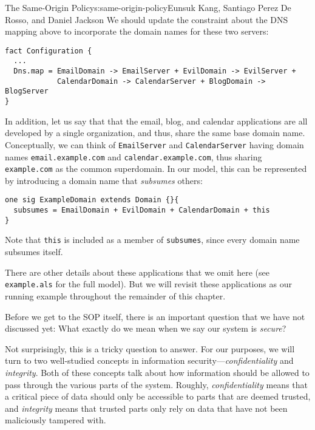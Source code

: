 \begin{aosachapter}{The Same-Origin Policy}{s:same-origin-policy}{Eunsuk Kang, Santiago Perez De Rosso, and Daniel Jackson}
We should update the constraint about the DNS mapping above to
incorporate the domain names for these two servers:

\begin{verbatim}
fact Configuration {
  ...
  Dns.map = EmailDomain -> EmailServer + EvilDomain -> EvilServer + 
            CalendarDomain -> CalendarServer + BlogDomain -> BlogServer  
}
\end{verbatim}

In addition, let us say that that the email, blog, and calendar
applications are all developed by a single organization, and thus, share
the same base domain name. Conceptually, we can think of
\texttt{EmailServer} and \texttt{CalendarServer} having domain names
\texttt{email.example.com} and \texttt{calendar.example.com}, thus
sharing \texttt{example.com} as the common superdomain. In our model,
this can be represented by introducing a domain name that
\emph{subsumes} others:

\begin{verbatim}
one sig ExampleDomain extends Domain {}{
  subsumes = EmailDomain + EvilDomain + CalendarDomain + this
}   
\end{verbatim}

Note that \texttt{this} is included as a member of \texttt{subsumes},
since every domain name subsumes itself.

There are other details about these applications that we omit here (see
\texttt{example.als} for the full model). But we will revisit these
applications as our running example throughout the remainder of this
chapter.

\label{security-properties}

Before we get to the SOP itself, there is an important question that we
have not discussed yet: What exactly do we mean when we say our system
is \emph{secure}?

Not surprisingly, this is a tricky question to answer. For our purposes,
we will turn to two well-studied concepts in information
security---\emph{confidentiality} and \emph{integrity}. Both of these
concepts talk about how information should be allowed to pass through
the various parts of the system. Roughly, \emph{confidentiality} means
that a critical piece of data should only be accessible to parts that
are deemed trusted, and \emph{integrity} means that trusted parts only
rely on data that have not been maliciously tampered with.

\label{dataflow-properties}


\end{aosachapter}

